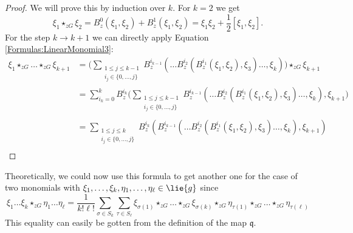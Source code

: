 \begin{proof}
	We will prove this by induction over $k$. For $k = 2$ we get
	\begin{equation*}
		\xi_1 \star_{zG} \xi_2
		=
		B_z^0 \left( \xi_1, \xi_2 \right)
		+
		B_z^1 \left( \xi_1, \xi_2 \right)
		=
		\xi_1 \xi_2 +
		\frac{1}{2} [\xi_1, \xi_2].
	\end{equation*}
	For the step $k \rightarrow k + 1$ we can directly apply Equation 
	\eqref{Formulas:LinearMonomial3}:
	\begin{align*}
		\xi_1 \star_{zG} \ldots \star_{zG} \xi_{k+1}
		& =
		\Bigg(
			\sum\limits_{\substack{
				1 \leq j \leq k-1 \\
				i_j \in \{0, \ldots, j\}
			}}
			B_z^{i_{k-1}}
			\left(
				\ldots B_z^{i_2}
				\left(
					B_z^{i_1} 
					\left( \xi_1, \xi_2 \right)
					, \xi_3	
				\right) 
				\ldots, \xi_{k}
			\right)
		\Bigg)
		\star_{zG} \xi_{k+1}
		\\
		& = 
		\sum\limits_{i_k = 0}^k
		B_z^{i_k}
		\Bigg(
			\sum\limits_{\substack{
				1 \leq j \leq k-1 \\
				i_j \in \{0, \ldots, j\} \\
			}}
			B_z^{i_{k-1}}
			\left(
				\ldots B_z^{i_2}
				\left(
					B_z^{i_1} 
					\left( \xi_1, \xi_2 \right)
					, \xi_3	
				\right) 
				\ldots, \xi_{k}
			\right)
			, \xi_{k+1}
		\Bigg)
		\\
		& = 
		\sum\limits_{\substack{
			1 \leq j \leq k \\
			i_j \in \{0, \ldots, j\} \\
		}}
		B_z^{i_k}
		\left(
			B_z^{i_{k-1}}
			\left(
				\ldots B_z^{i_2}
				\left(
					B_z^{i_1} 
					\left( \xi_1, \xi_2 \right)
					, \xi_3	
				\right) 
				\ldots, \xi_{k}
			\right)
			, \xi_{k+1}
		\right)
	\end{align*}
\end{proof}
Theoretically, we could now use this formula to get another one for the 
case of two monomials with $\xi_1, \ldots, \xi_k, \eta_1, \ldots, 
\eta_{\ell} \in \lie{g}$ since
\begin{equation*}
	\xi_1 \ldots \xi_k \star_{zG} \eta_1 \ldots \eta_{\ell}
	=
	\frac{1}{k! \ell!}
	\sum\limits_{\sigma \in S_k}
	\sum\limits_{\tau \in S_{\ell}}
	\xi_{\sigma(1)} \star_{zG} \ldots \star_{zG} \xi_{\sigma(k)}
	\star_{zG}
	\eta_{\tau(1)} \star_{zG} \ldots \star_{zG} \eta_{\tau(\ell)}
\end{equation*}
This equality can easily be gotten from the definition of the map 
$\mathfrak{q}$.



